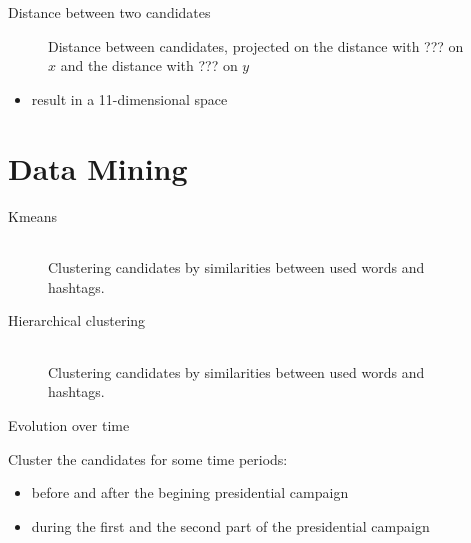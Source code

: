 \documentclass{beamer}
\begin{document}
\begin{frame}{Distance between two candidates}
\begin{figure}


\caption{Distance between candidates, projected on the distance with ??? on $x$ and the distance with ??? on $y$}
\end{figure}
\begin{itemize}
\item result in a 11-dimensional space
\end{itemize}
\end{frame}

\section{Data Mining}
\begin{frame}{Kmeans}
\begin{figure}{}
\begin{tabular}{| c | c | c |}

\end{tabular}
\caption{Clustering candidates by similarities between used words and hashtags.}
\end{figure}
\end{frame}

\begin{frame}{Hierarchical clustering}
\begin{figure}{}
\begin{tabular}{| c | c | c |}
\end{tabular}
\caption{Clustering candidates by similarities between used words and hashtags.}
\end{figure}
\end{frame}

\begin{frame}{Evolution over time}
\begin{block}{}
Cluster the candidates for some time periods:
\begin{itemize}
\item before and after the begining presidential campaign
\item during the first and the second part of the presidential campaign
\end{itemize}
\end{block}
\end{frame}
\end{document}
